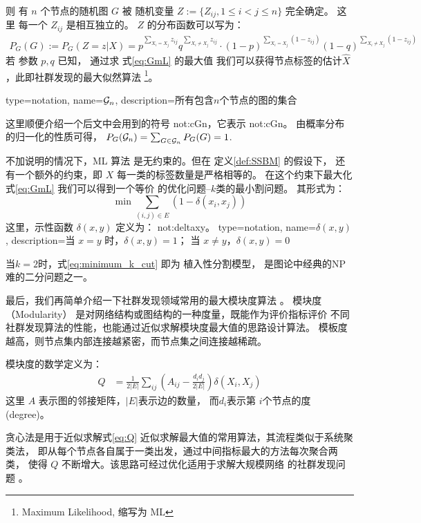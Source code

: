 则 有 $n$ 个节点的随机图 $G$ 
被 
随机变量 $Z:=\{Z_{ij}, 1\leq i<j\leq n\}$ 完全确定。
这里 每一个 $Z_{ij}$ 是相互独立的。
$Z$ 的分布函数可以写为：
\begin{align}
P_G(G):=P_G(Z = z| X) = p^{\sum_{X_i = X_j} z_{ij}}q^{\sum_{X_i \neq X_j} z_{ij}}
\cdot (1-p)^{\sum_{X_i = X_j} (1-z_{ij})}(1-q)^{\sum_{X_i \neq X_j} (1-z_{ij})} \label{eq:GmL}
\end{align}
若 参数 $p, q$ 已知，
通过求
式\eqref{eq:GmL} 的最大值
我们可以获得节点标签的估计$\hat{X}$，此即社群发现的最大似然算法
\footnote{Maximum Likelihood, 缩写为 ML}。

{
  type=notation,
  name={$\mathcal{G}_n$},
  description={所有包含$n$个节点的图的集合}
}

这里顺便介绍一个后文中会用到的符号 \gls{not:cGn}，它表示
\glsdesc{not:cGn}。
由概率分布的归一化的性质可得，
$P_G(\mathcal{G}_n) = \sum_{G\in \mathcal{G}_n}P_G(G)=1$.

不加说明的情况下，ML 算法 是无约束的。但在
定义\ref{def:SSBM} 的假设下，
还有一个额外的约束，即 $X$ 每一类的标签数量是严格相等的。
在这个约束下最大化式\eqref{eq:GmL} 我们可以得到一个等价
的优化问题--$k$类的最小割问题。
其形式为：
\begin{equation}\label{eq:minimum_k_cut}
  \min \sum_{(i,j) \in E} (1-\delta(x_i, x_j))
\end{equation}
这里，示性函数 $\delta(x,y)$ 定义为：
\glsdesc{not:deltaxy}。
{
  type=notation,
  name={$\delta(x,y)$},
  description={当 $x=y$ 时，$\delta(x,y) = 1$； 当 $x\neq y$，$\delta(x,y)=0$}
}

当$k=2$时，式\eqref{eq:minimum_k_cut} 即为 植入性分割模型，
是图论中经典的NP难的二分问题之一。

最后，我们再简单介绍一下社群发现领域常用的最大模块度算法
\cite{newman2006modularity}。
模块度（Modularity）
是对网络结构或图结构的一种度量，既能作为评价指标评价
不同社群发现算法的性能，也能通过近似求解模块度最大值的思路设计算法。
模板度越高，则节点集内部连接越紧密，而节点集之间连接越稀疏。

模块度的数学定义为：
\begin{align}\label{eq:Q}
  Q &= \frac{1}{2 |E|} \sum_{ij} (A_{ij} - \frac{d_i d_j}{2 |E|}) \delta(X_i, X_j)
\end{align}
这里 $A$ 表示图的邻接矩阵，$|E|$表示边的数量，
而$d_i$表示第
$i$个节点的度(degree)。

贪心法是用于近似求解式\eqref{eq:Q}
近似求解最大值的常用算法，其流程类似于系统聚类法，
即从每个节点各自属于一类出发，通过中间指标最大的方法每次聚合两类，
使得 $Q$ 不断增大。该思路可经过优化适用于求解大规模网络
的社群发现问题 \cite{clauset2004finding}。


